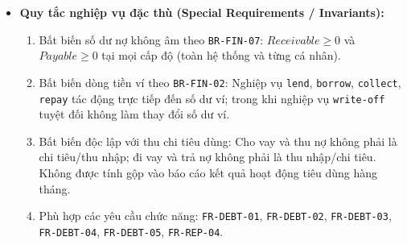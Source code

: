\documentclass[11pt,a4paper]{article}
\providecommand{\tightlist}{
  \setlength{\itemsep}{0pt}\setlength{\parskip}{0pt}}
\begin{document}
\begin{itemize}
\begin{itemize}
    \begin{itemize}
    \tightlist
    \item
      2c4a1. Tại bước 2c4, hệ thống phát hiện số tiền trả nợ lớn hơn
      nghĩa vụ nợ phải trả còn lại đối với chủ nợ.
    \item
      2c4a2. Hệ thống chặn lại và thông báo lỗi: "Số tiền hoàn trả không
      được vượt quá nghĩa vụ nợ hiện tại đối với chủ nợ".
    \item
      2c4a3. Người dùng điều chỉnh lại số tiền trả nợ.
    \end{itemize}
  \item
    \emph{2d3a. Xóa nợ vượt quá dư nợ thực tế:}

    \begin{itemize}
    \tightlist
    \item
      2d3a1. Tại bước 2d3, số tiền xóa nợ nhập vào vượt quá số dư nợ của
      đối tác.
    \item
      2d3a2. Hệ thống từ chối và báo lỗi số tiền xóa nợ vượt quá giới
      hạn dư nợ cho phép.
    \end{itemize}
  \item
    \emph{5b. Nhập số tiền nhỏ hơn hoặc bằng 0 hoặc bỏ trống tên đối
    tác:}

    \begin{itemize}
    \tightlist
    \item
      5b1. Hệ thống phát hiện \(amount \le 0\) hoặc trường tên đối tác
      \texttt{person} để trống.
    \item
      5b2. Hệ thống đánh dấu lỗi tại các trường tương ứng và yêu cầu
      Người dùng điền đầy đủ dữ liệu hợp lệ.
    \end{itemize}
  \end{itemize}
\item
  \textbf{Quy tắc nghiệp vụ đặc thù (Special Requirements /
  Invariants):}

  \begin{enumerate}
  \def\labelenumi{\arabic{enumi}.}
  \tightlist
  \item
    Bất biến số dư nợ không âm theo \texttt{BR-FIN-07}:
    \(Receivable \ge 0\) và \(Payable \ge 0\) tại mọi cấp độ (toàn hệ
    thống và từng cá nhân).
  \item
    Bất biến dòng tiền ví theo \texttt{BR-FIN-02}: Nghiệp vụ
    \texttt{lend}, \texttt{borrow}, \texttt{collect}, \texttt{repay} tác
    động trực tiếp đến số dư ví; trong khi nghiệp vụ \texttt{write-off}
    tuyệt đối không làm thay đổi số dư ví.
  \item
    Bất biến độc lập với thu chi tiêu dùng: Cho vay và thu nợ không phải
    là chi tiêu/thu nhập; đi vay và trả nợ không phải là thu nhập/chi
    tiêu. Không được tính gộp vào báo cáo kết quả hoạt động tiêu dùng
    hàng tháng.
  \item
    Phù hợp các yêu cầu chức năng: \texttt{FR-DEBT-01},
    \texttt{FR-DEBT-02}, \texttt{FR-DEBT-03}, \texttt{FR-DEBT-04},
    \texttt{FR-DEBT-05}, \texttt{FR-REP-04}.
  \end{enumerate}
\end{itemize}
\end{document}
